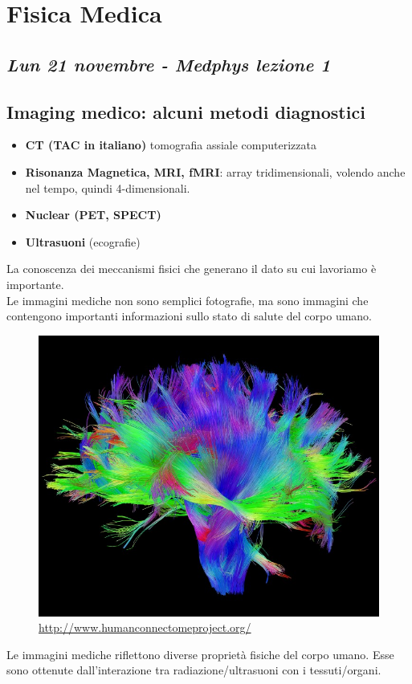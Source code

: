 \chapter{Fisica Medica}


\section{\textit{Lun 21 novembre - Medphys lezione 1}}
\section{Imaging medico: alcuni metodi diagnostici}

\begin{itemize}
	\item \textbf{CT (TAC in italiano)} tomografia assiale computerizzata
	\item \textbf{Risonanza Magnetica, MRI, fMRI}: array tridimensionali, volendo anche nel tempo, quindi 4-dimensionali.
	\item \textbf{Nuclear (PET, SPECT)}
	\item \textbf{Ultrasuoni} (ecografie)
\end{itemize}

La conoscenza dei meccanismi fisici che generano il dato su cui lavoriamo è importante.\\
Le immagini mediche non sono semplici fotografie, ma sono immagini che contengono importanti informazioni sullo stato di salute del corpo umano.\\

\begin{figure}[ht]
	\centering
	\includegraphics[width=0.6\linewidth]{figure_med/White-Matter-Fibers.jpg}
	\caption{\url{http://www.humanconnectomeproject.org/}}
\end{figure}
\FloatBarrier

Le immagini mediche riflettono diverse proprietà fisiche del corpo umano. Esse sono ottenute dall'interazione tra radiazione/ultrasuoni con i tessuti/organi.\\

